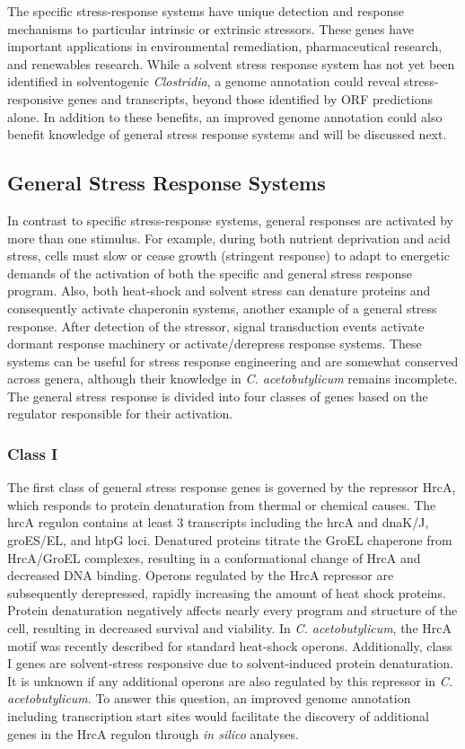 The specific stress-response systems have unique detection and response mechanisms to particular intrinsic or extrinsic stressors. These genes have important applications in environmental remediation,\cite{128} pharmaceutical research,\cite{127} and renewables research. While a solvent stress response system has not yet been identified in solventogenic \textit{Clostridia}, a genome annotation could reveal stress-responsive genes and transcripts, beyond those identified by ORF predictions alone. In addition to these benefits, an improved genome annotation could also benefit knowledge of general stress response systems and will be discussed next. 


\subsection{General Stress Response Systems}

In contrast to specific stress-response systems, general responses are activated by more than one stimulus. For example, during both nutrient deprivation and acid stress, cells must slow or cease growth (stringent response) to adapt to energetic demands of the activation of both the specific and general stress response program. Also, both heat-shock and solvent stress can denature proteins and consequently activate chaperonin systems, another example of a general stress response.\cite{74,75,77} After detection of the stressor, signal transduction events activate dormant response machinery or activate/derepress response systems\cite{77,78}. These systems can be useful for stress response engineering\cite{45,46} and are somewhat conserved across genera, although their knowledge in \textit{C. acetobutylicum} remains incomplete. The general stress response is divided into four classes of genes based on the regulator responsible for their activation. 

\subsubsection{Class I}
The first class of general stress response genes is governed by the repressor HrcA, which responds to protein denaturation from thermal or chemical causes. The hrcA regulon contains at least 3 transcripts including the hrcA and dnaK/J, groES/EL, and htpG loci.\cite{42} Denatured proteins titrate the GroEL chaperone from HrcA/GroEL complexes, resulting in a conformational change of HrcA and decreased DNA binding.\cite{77,78} Operons regulated by the HrcA repressor are subsequently derepressed, rapidly increasing the amount of heat shock proteins. Protein denaturation negatively affects nearly every program and structure of the cell, resulting in decreased survival and viability. In \textit{C. acetobutylicum}, the HrcA motif was recently described for standard heat-shock operons.\cite{42} Additionally, class I genes are solvent-stress responsive due to solvent-induced protein denaturation.\cite{74,75} It is unknown if any additional operons are also regulated by this repressor in \textit{C. acetobutylicum}. To answer this question, an improved genome annotation including transcription start sites would facilitate the discovery of additional genes in the HrcA regulon through \textit{in silico} analyses.

